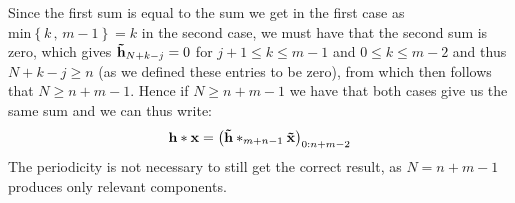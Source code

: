 \documentclass{article}
\begin{document}
Since the first sum is equal to the sum we get in the first case as $\text{min}\left\{k\,,\,m-1\right\} = k$ in the second case, we must have that the second sum is zero, which gives $\mathbf{\Tilde{h}}_{N+k-j} = 0$  for $j +1 \leq k \leq m-1$ and $0 \leq k \leq m - 2$ and thus $N + k - j \geq n$ (as we defined these entries to be zero), from which then follows that $N \geq n + m - 1$. Hence if $N \geq n + m - 1$ we have that both cases give us the same sum and we can thus write:
\begin{equation*}
    \mathbf{h} * \mathbf{x} = \left(\mathbf{\Tilde{h}} *_{m+n-1} \mathbf{\Tilde{x}}\right)_{0:n+m-2}
\end{equation*}
The periodicity is not necessary to still get the correct result, as $N = n + m - 1$ produces only relevant components.
\end{document}
